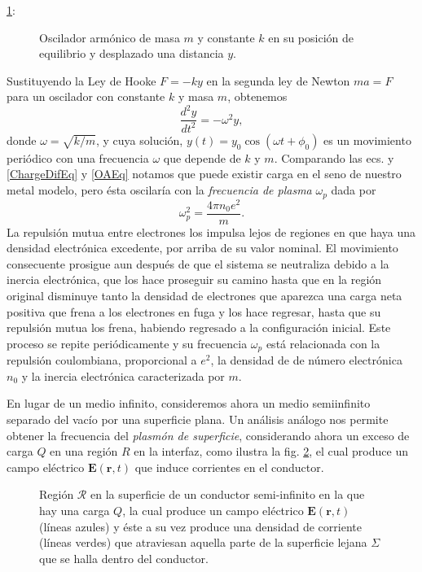 \documentclass[12pt]{article}
\begin{document}
\ref{OscArmonicoSimple}:
\begin{figure}
  \centering
  
  \caption{\label{OscArmonicoSimple} Oscilador armónico de masa $m$ y
    constante $k$ en su posición de equilibrio y desplazado una
    distancia $y$.}
\end{figure}
Sustituyendo la Ley de Hooke $F= -ky$ en la segunda ley de Newton
$ma=F$ para un oscilador con constante $k$ y masa $m$, obtenemos
\begin{equation}
  \label{OAEq}
  \frac{d^{2}y}{dt^{2}}=-\omega^2y,
\end{equation}
donde $\omega=\sqrt{k/m}$, y cuya solución,
$y(t)=y_{0}\cos(\omega t+\phi_0)$ es un movimiento periódico con una
frecuencia $\omega$ que depende de $k$ y $m$.  Comparando las ecs.  y
\eqref{ChargeDifEq} y \eqref{OAEq} notamos que puede existir carga en
el seno de nuestro metal modelo, pero ésta oscilaría con la {\em
  frecuencia de plasma} $\omega_p$ dada por
\begin{equation}
  \label{plasmafec}
  \omega _{p}^{2} = \frac{4\pi n_0e^{2}}{m}.
\end{equation}
La repulsión mutua entre electrones los impulsa lejos de regiones en
que haya una densidad electrónica excedente, por arriba de su valor
nominal. El movimiento consecuente prosigue aun después de que el
sistema se neutraliza debido a la inercia electrónica, que los hace
proseguir su camino hasta que en la región original disminuye tanto la
densidad de electrones que aparezca una carga neta positiva que frena
a los electrones en fuga y los hace regresar, hasta que su repulsión
mutua los frena, habiendo regresado a la configuración inicial. Este
proceso se repite periódicamente y su frecuencia $\omega_p$ está
relacionada con la repulsión coulombiana, proporcional a $e^2$, la
densidad de de número electrónica $n_0$ y la inercia electrónica
caracterizada por $m$.

En lugar de un medio infinito, consideremos ahora un medio
semiinfinito separado del vacío por una superficie plana.  Un análisis
análogo nos permite obtener la frecuencia del {\em plasmón de
  superficie}, considerando ahora un exceso de carga $Q$ en una región
$R$ en la interfaz, como ilustra la fig.  \ref{Surfplasmon}, el cual
produce un campo eléctrico $\bm{E}(\bm{r},t)$ que induce corrientes en
el conductor.
\begin{figure}
  \centering
  
  \caption{Región $\mathcal{R}$ en la superficie de un conductor
    semi-infinito en la que hay una carga $Q$, la cual produce un
    campo eléctrico $\bm{E}(\bm{r},t)$ (líneas azules) y éste a su vez
    produce una densidad de corriente (líneas verdes) que atraviesan
    aquella parte de la superficie lejana $\Sigma$ que se halla dentro
    del conductor.}
\label{Surfplasmon}
\end{figure}
\end{document}
